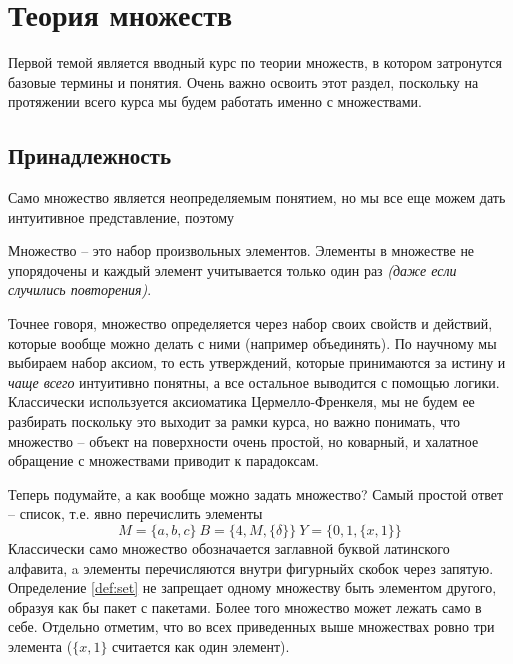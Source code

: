 
\chapter{Теория множеств}

\begin{commentary}
Первой темой является вводный курс по теории множеств, в котором затронутся базовые термины и понятия. Очень важно освоить этот раздел, поскольку на протяжении всего курса мы будем работать именно с множествами.
\end{commentary}

\section{Принадлежность}

Само множество является неопределяемым понятием, но мы все еще можем дать интуитивное представление, поэтому
\begin{definition}\label{def:set}
Множество -- это набор произвольных элементов. Элементы в множестве не упорядочены и каждый элемент учитывается только один раз \textit{(даже если случились повторения)}.
\end{definition}
Точнее говоря, множество определяется через набор своих свойств и действий, которые вообще можно делать с ними (например объединять). По научному мы выбираем набор аксиом, то есть утверждений, которые принимаются за истину и \textit{чаще всего} интуитивно понятны, а все остальное выводится с помощью логики. Классически используется аксиоматика Цермелло-Френкеля, мы не будем ее разбирать поскольку это выходит за рамки курса, но важно понимать, что множество -- объект на поверхности очень простой, но коварный, и халатное обращение с множествами приводит к парадоксам.

Теперь подумайте, а как вообще можно задать множество? Самый простой ответ -- список, т.е. явно перечислить элементы
$$M=\{a,b,c\}\ B=\{4,M,\{\delta\}\}\ Y=\{0,1,\{x,1\}\}$$
Классически само множество обозначается заглавной буквой латинского алфавита, a элементы перечисляются внутри фигурныйх скобок через запятую. Определение \ref{def:set} не запрещает одному множеству быть элементом другого, образуя как бы пакет с пакетами. Более того множество может лежать само в себе. Отдельно отметим, что во всех приведенных выше множествах ровно три элемента ($\{x,1\}$ считается как один элемент).

